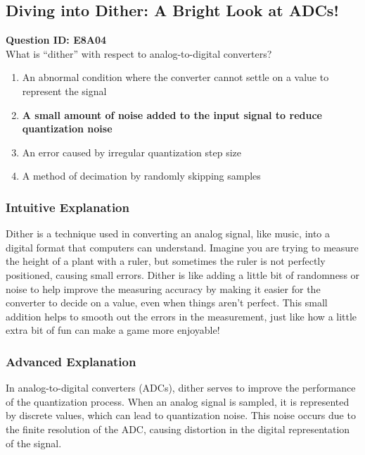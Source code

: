 \subsection{Diving into Dither: A Bright Look at ADCs!}

\begin{tcolorbox}
    \textbf{Question ID: E8A04} \\
    What is “dither” with respect to analog-to-digital converters? \\

    \begin{enumerate}[label=\Alph*.]
        \item An abnormal condition where the converter cannot settle on a value to represent the signal
        \item \textbf{A small amount of noise added to the input signal to reduce quantization noise}
        \item An error caused by irregular quantization step size
        \item A method of decimation by randomly skipping samples
    \end{enumerate}
\end{tcolorbox}

\subsubsection{Intuitive Explanation}
Dither is a technique used in converting an analog signal, like music, into a digital format that computers can understand. Imagine you are trying to measure the height of a plant with a ruler, but sometimes the ruler is not perfectly positioned, causing small errors. Dither is like adding a little bit of randomness or noise to help improve the measuring accuracy by making it easier for the converter to decide on a value, even when things aren't perfect. This small addition helps to smooth out the errors in the measurement, just like how a little extra bit of fun can make a game more enjoyable!

\subsubsection{Advanced Explanation}
In analog-to-digital converters (ADCs), dither serves to improve the performance of the quantization process. When an analog signal is sampled, it is represented by discrete values, which can lead to quantization noise. This noise occurs due to the finite resolution of the ADC, causing distortion in the digital representation of the signal.

